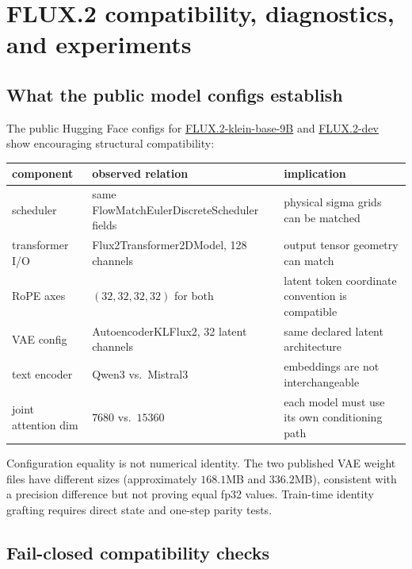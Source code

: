 \documentclass[11pt,a4paper]{article}
\theoremstyle{plain}
\theoremstyle{definition}
\begin{document}
\section{FLUX.2 compatibility, diagnostics, and experiments}
\label{sec:practice}

\subsection{What the public model configs establish}

The public Hugging Face configs for
\href{https://huggingface.co/black-forest-labs/FLUX.2-klein-base-9B}{FLUX.2-klein-base-9B}
and
\href{https://huggingface.co/black-forest-labs/FLUX.2-dev}{FLUX.2-dev}
show encouraging structural compatibility:
\begin{center}
\begin{tabular}{@{}
  >{\raggedright\arraybackslash}p{}
  >{\raggedright\arraybackslash}p{}
  >{\raggedright\arraybackslash}p{}
@{}}
\toprule
component & observed relation & implication\\
\midrule
scheduler & same FlowMatchEulerDiscreteScheduler fields & physical sigma grids can be matched\\
transformer I/O & Flux2Transformer2DModel, 128 channels & output tensor geometry can match\\
RoPE axes & $(32,32,32,32)$ for both & latent token coordinate convention is compatible\\
VAE config & AutoencoderKLFlux2, 32 latent channels & same declared latent architecture\\
text encoder & Qwen3 vs.\ Mistral3 & embeddings are not interchangeable\\
joint attention dim & $7680$ vs.\ $15360$ & each model must use its own conditioning path\\
\bottomrule
\end{tabular}
\end{center}

Configuration equality is not numerical identity.  The two published VAE weight files have
different sizes (approximately $168.1$MB and $336.2$MB), consistent with a precision difference
but not proving equal fp32 values.  Train-time identity grafting requires direct state and
one-step parity tests.

\subsection{Fail-closed compatibility checks}
\end{document}
